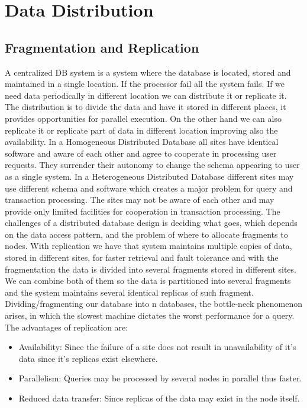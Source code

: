 \documentclass[a4page, 11pt]{article}
\begin{document}
\section{Data Distribution}
\subsection{Fragmentation and Replication}
A centralized DB system is a system where the database is located, stored and maintained in a single location. If the processor fail all the system fails.
If we need data periodically in different location we can distribute it or replicate it. The distribution is to divide the data and have it stored in different places, it provides opportunities for parallel execution. On the other hand we can also replicate it or replicate part of data in different location improving also the availability.
\newline
In a Homogeneous Distributed Database all sites have identical software and aware of each other and agree to cooperate in processing user requests. They surrender their autonomy to change the schema appearing to user as a single system.
\newline
In a Heterogeneous Distributed Database different sites may use different schema and software which creates a major problem for query and transaction processing. The sites may not be aware of each other and may provide only limited facilities for cooperation in transaction processing.
\newline
The challenges of a distributed database design is deciding what goes, which depends on the data access pattern, and the problem of where to allocate fragments to nodes.
With replication we have that system maintains multiple copies of data, stored in different sites, for faster retrieval and fault tolerance and with the fragmentation the data is divided into several fragments stored in different sites. We can combine both of them so the data is partitioned into several fragments and the system maintains several identical replicas of such fragment.
\newline
Dividing/fragmenting our database into n databases, the bottle-neck phenomenon arises, in which the slowest machine dictates the worst performance for a query.
\newline
The advantages of replication are:
\begin{itemize}[noitemsep]
	\item
	Availability: Since the failure of a site does not result in unavailability of it's data since it's replicas exist elsewhere.
	\item
	Parallelism: Queries may be processed by several nodes in parallel thus faster.
	\item
	Reduced data transfer: Since replicas of the data may exist in the node itself.
\end{itemize}
\end{document}
